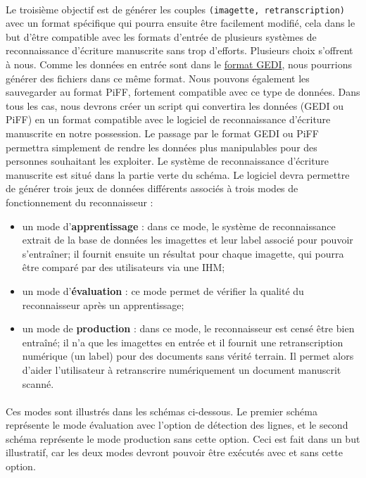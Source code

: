 \paragraph{}
Le troisième objectif est de générer les couples \texttt{(imagette, retranscription)} avec un format spécifique
qui pourra ensuite être facilement modifié, cela dans le but d’être compatible avec les formats d’entrée de
plusieurs systèmes de reconnaissance d’écriture manuscrite sans trop d’efforts.
Plusieurs choix s’offrent à nous. Comme les données en entrée sont dans le
\href{https://lampsrv02.umiacs.umd.edu/projdb/project.php?id=53}{format GEDI}, nous pourrions générer des
fichiers dans ce même format. Nous pouvons également les sauvegarder au format PiFF\cite{piff:2017},
fortement compatible avec ce type de données. Dans tous les cas, nous devrons créer un script qui
convertira les données (GEDI ou PiFF) en un format compatible avec le logiciel de reconnaissance d’écriture
manuscrite en notre possession. Le passage par le format GEDI ou PiFF permettra simplement de rendre les données
plus manipulables pour des personnes souhaitant les exploiter. Le système de reconnaissance d’écriture manuscrite
est situé dans la partie verte du schéma. Le logiciel devra permettre de générer trois jeux de données différents
associés à trois modes de fonctionnement du reconnaisseur :

\begin{itemize}
\item un mode d’\textbf{apprentissage} : dans ce mode, le système de reconnaissance extrait de la base de données les
imagettes et leur label associé pour pouvoir s'entraîner; il fournit ensuite un résultat pour chaque imagette,
qui pourra être comparé par des utilisateurs via une IHM;
\item un mode d’\textbf{évaluation} : ce mode permet de vérifier la qualité du reconnaisseur après un apprentissage;
\item un mode de \textbf{production} : dans ce mode, le reconnaisseur est censé être bien entraîné; il n’a que les
imagettes en entrée et il fournit une retranscription numérique (un label) pour des documents sans vérité terrain.
Il permet alors d’aider l’utilisateur à retranscrire numériquement un document manuscrit scanné.
\end{itemize}

\paragraph{}
Ces modes sont illustrés dans les schémas ci-dessous. Le premier schéma représente le mode évaluation avec l’option
de détection des lignes, et le second schéma représente le mode production sans cette option. Ceci est fait dans un
but illustratif, car les deux modes devront pouvoir être exécutés avec et sans cette option.

